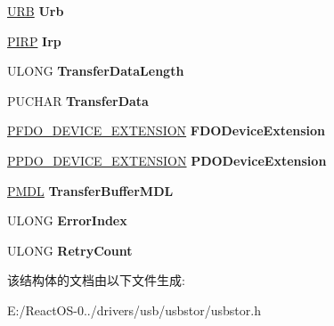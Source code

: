 \begin{DoxyCompactItemize}
\begin{tabbing}
\end{tabbing}\item 
\mbox{\label{struct_i_r_p___c_o_n_t_e_x_t_a2992a1734c050602ed51a8a323253c96}} 
\hyperlink{struct___u_r_b}{U\+RB} {\bfseries Urb}
\item 
\mbox{\label{struct_i_r_p___c_o_n_t_e_x_t_ad1f34626f5ba6d1ea95f9e0ac082cfad}} 
\hyperlink{interfacevoid}{P\+I\+RP} {\bfseries Irp}
\item 
\mbox{\label{struct_i_r_p___c_o_n_t_e_x_t_a5eae9e2915ec111c0c9e59eb478add40}} 
U\+L\+O\+NG {\bfseries Transfer\+Data\+Length}
\item 
\mbox{\label{struct_i_r_p___c_o_n_t_e_x_t_ade943559631f05a0e6405139d07f46d8}} 
P\+U\+C\+H\+AR {\bfseries Transfer\+Data}
\item 
\mbox{\label{struct_i_r_p___c_o_n_t_e_x_t_a2406282c18ba9dd6b5880e9d3cf67fe2}} 
\hyperlink{struct___f_d_o___d_e_v_i_c_e___e_x_t_e_n_s_i_o_n}{P\+F\+D\+O\+\_\+\+D\+E\+V\+I\+C\+E\+\_\+\+E\+X\+T\+E\+N\+S\+I\+ON} {\bfseries F\+D\+O\+Device\+Extension}
\item 
\mbox{\label{struct_i_r_p___c_o_n_t_e_x_t_a6c818199d2c65e0f7e3c93e41b48ba05}} 
\hyperlink{struct___p_d_o___d_e_v_i_c_e___e_x_t_e_n_s_i_o_n}{P\+P\+D\+O\+\_\+\+D\+E\+V\+I\+C\+E\+\_\+\+E\+X\+T\+E\+N\+S\+I\+ON} {\bfseries P\+D\+O\+Device\+Extension}
\item 
\mbox{\label{struct_i_r_p___c_o_n_t_e_x_t_a05cb8aa5ce568716d509c95d8e0e21ff}} 
\hyperlink{interfacevoid}{P\+M\+DL} {\bfseries Transfer\+Buffer\+M\+DL}
\item 
\mbox{\label{struct_i_r_p___c_o_n_t_e_x_t_aab411ff7cbc652ba4e9ca03a5c0808b3}} 
U\+L\+O\+NG {\bfseries Error\+Index}
\item 
\mbox{\label{struct_i_r_p___c_o_n_t_e_x_t_ab9e10aed898eb2728a05917e54ea7cc0}} 
U\+L\+O\+NG {\bfseries Retry\+Count}
\end{DoxyCompactItemize}


该结构体的文档由以下文件生成\+:\begin{DoxyCompactItemize}
\item 
E\+:/\+React\+O\+S-\/0../drivers/usb/usbstor/usbstor.\+h\end{DoxyCompactItemize}
